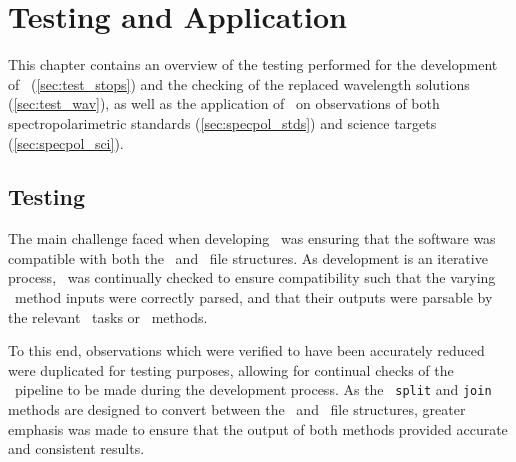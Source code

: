 \chapter{Testing and Application}

This chapter contains an overview of the testing performed for the development of \stops\ (\autoref{sec:test_stops}) and the checking of the replaced wavelength solutions (\autoref{sec:test_wav}), as well as the application of \stops\ on observations of both spectropolarimetric standards (\autoref{sec:specpol_stds}) and science targets (\autoref{sec:specpol_sci}).

\section[Testing \textsc{stops}]{Testing \stops} \label{sec:test_stops}

The main challenge faced when developing \stops\ was ensuring that the software was compatible with both the \polsalt\ and \iraf\ file structures. As development is an iterative process, \stops\ was continually checked to ensure compatibility such that the varying \stops\ method inputs were correctly parsed, and that their outputs were parsable by the relevant \iraf\ tasks or \polsalt\ methods.

To this end, observations which were verified to have been accurately reduced were duplicated for testing purposes, allowing for continual checks of the \stops\ pipeline to be made during the development process. As the \stops\ \texttt{split} and \texttt{join} methods are designed to convert between the \polsalt\ and \iraf\ file structures, greater emphasis was made to ensure that the output of both methods provided accurate and consistent results.



